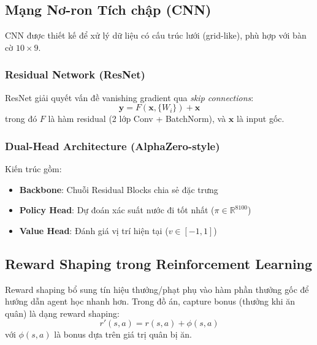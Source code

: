 \subsection{Mạng Nơ-ron Tích chập (CNN)}
CNN được thiết kế để xử lý dữ liệu có cấu trúc lưới (grid-like), phù hợp với bàn cờ $10 \times 9$.

\subsubsection{Residual Network (ResNet)}
ResNet giải quyết vấn đề vanishing gradient qua \textit{skip connections}:
\begin{equation}
    \mathbf{y} = F(\mathbf{x}, \{W_i\}) + \mathbf{x}
\end{equation}
trong đó $F$ là hàm residual (2 lớp Conv + BatchNorm), và $\mathbf{x}$ là input gốc.

\subsubsection{Dual-Head Architecture (AlphaZero-style)}
Kiến trúc gồm:
\begin{itemize}
    \item \textbf{Backbone}: Chuỗi Residual Blocks chia sẻ đặc trưng
    \item \textbf{Policy Head}: Dự đoán xác suất nước đi tốt nhất ($\pi \in \mathbb{R}^{8100}$)
    \item \textbf{Value Head}: Đánh giá vị trí hiện tại ($v \in [-1, 1]$)
\end{itemize}

\subsection{Reward Shaping trong Reinforcement Learning}
Reward shaping bổ sung tín hiệu thưởng/phạt phụ vào hàm phần thưởng gốc để hướng dẫn agent học nhanh hơn. Trong đồ án, capture bonus (thưởng khi ăn quân) là dạng reward shaping:
\begin{equation}
    r'(s, a) = r(s, a) + \phi(s, a)
\end{equation}
với $\phi(s, a)$ là bonus dựa trên giá trị quân bị ăn.
